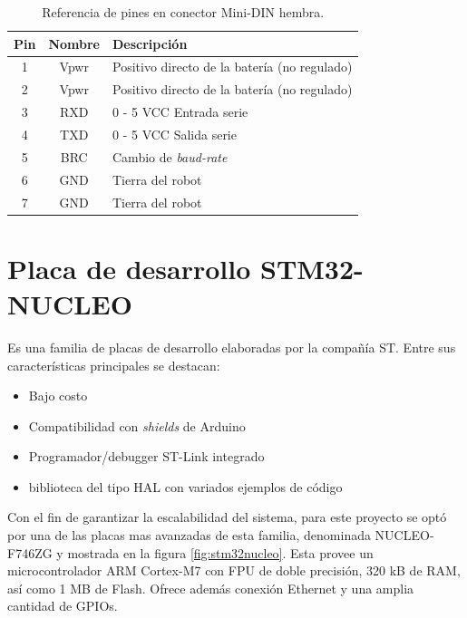 \begin{table}[h]
    \centering
    \caption{Referencia de pines en conector Mini-DIN hembra.}
    \label{tab:Pines}
    \begin{tabular}{ccl}
        \toprule
        \textbf{Pin} & \textbf{Nombre} & \textbf{Descripción}                         \\
        \midrule
        1            & Vpwr            & Positivo directo de la batería (no regulado) \\
        2            & Vpwr            & Positivo directo de la batería (no regulado) \\
        3            & RXD             & 0 - 5 VCC Entrada serie                      \\
        4            & TXD             & 0 - 5 VCC Salida serie                       \\
        5            & BRC             & Cambio de \textit{baud-rate}                 \\
        6            & GND             & Tierra del robot                             \\
        7            & GND             & Tierra del robot                             \\
        \bottomrule
        \hline
    \end{tabular}
    \label{tab:distribucionPines}
\end{table}

\section{Placa de desarrollo STM32-NUCLEO}

Es una familia de placas de desarrollo elaboradas por la compañía ST. Entre sus características principales se destacan:

\begin{itemize}
    \item Bajo costo
    \item Compatibilidad con \textit{shields} de Arduino
    \item Programador/debugger ST-Link integrado
    \item biblioteca del tipo HAL con variados ejemplos de código
\end{itemize}

Con el fin de garantizar la escalabilidad del sistema, para este proyecto se optó por una de las placas mas avanzadas de esta familia, denominada NUCLEO-F746ZG y mostrada en la figura \ref{fig:stm32nucleo}. Esta provee un microcontrolador ARM Cortex-M7 con FPU de doble precisión, 320 kB de RAM, así como 1 MB de Flash. Ofrece además conexión Ethernet y una amplia cantidad de GPIOs.

